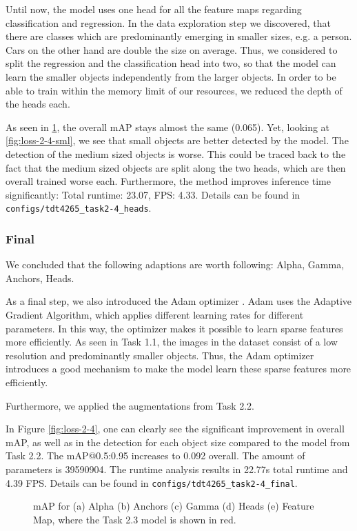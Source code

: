 \documentclass{article}
\begin{document}
Until now, the model uses one head for all the feature maps regarding classification and regression. In the data exploration step we discovered, that there are classes which are predominantly emerging in smaller sizes, e.g. a person. Cars on the other hand are double the size on average. Thus, we considered to split the regression and the classification head into two, so that the model can learn the smaller objects independently from the larger objects. In order to be able to train within the memory limit of our resources, we reduced the depth of the heads each.

As seen in \ref{fig:loss-2-4-mAP}, the overall mAP stays almost the same (0.065). Yet, looking at \ref{fig:loss-2-4-sml}, we see that small objects are better detected by the model. The detection of the medium sized objects is worse. This could be traced back to the fact that the medium sized objects are split along the two heads, which are then overall trained worse each. Furthermore, the method improves inference time significantly: Total runtime: 23.07, FPS: 4.33. Details can be found in \texttt{configs/tdt4265\_task2-4\_heads}.


\subsubsection*{Final}
We concluded that the following adaptions are worth following: Alpha, Gamma, Anchors, Heads.

As a final step, we also introduced the Adam optimizer \cite{kingma2014adam}. Adam uses the Adaptive Gradient Algorithm, which applies different learning rates for different parameters. In this way, the optimizer makes it possible to learn sparse features more efficiently. As seen in Task 1.1, the images in the dataset consist of a low resolution and predominantly smaller objects. Thus, the Adam optimizer introduces a good mechanism to make the model learn these sparse features more efficiently.

Furthermore, we applied the augmentations from Task 2.2.

In Figure \ref{fig:loss-2-4}, one can clearly see the significant improvement in overall mAP, as well as in the detection for each object size compared to the model from Task 2.2. The mAP@0.5:0.95 increases to 0.092 overall. The amount of parameters is 39590904. The runtime analysis results in 22.77s total runtime and 4.39 FPS. Details can be found in \texttt{configs/tdt4265\_task2-4\_final}.

\begin{figure}[t!]
    \centering
    \subfigure[]{}
    \subfigure[]{}
    \subfigure[]{}
    \subfigure[]{}
    \subfigure[]{} 
    \caption{mAP for (a) Alpha (b) Anchors (c) Gamma (d) Heads (e) Feature Map, where the Task 2.3 model is shown in red.}
    \label{fig:loss-2-4-mAP}
\end{figure}
\end{document}
